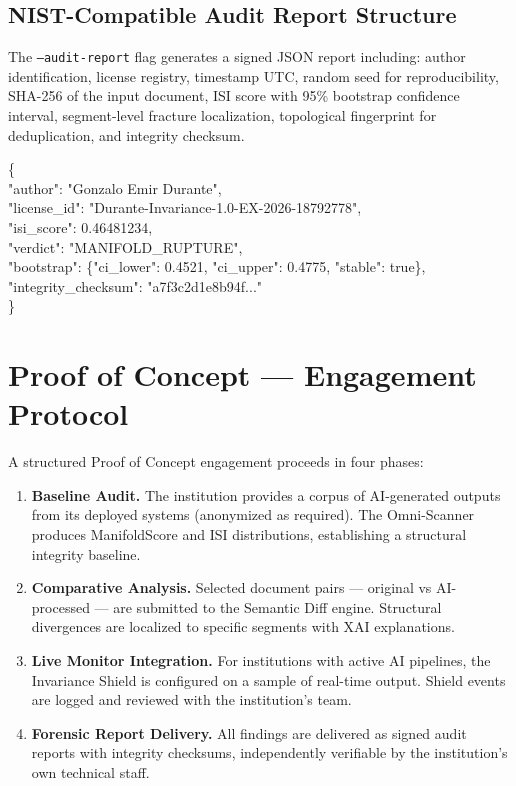 \documentclass[11pt, a4paper]{article}
\begin{document}
\subsection{NIST-Compatible Audit Report Structure}

The \texttt{--audit-report} flag generates a signed JSON report including:
author identification, license registry, timestamp UTC, random seed for
reproducibility, SHA-256 of the input document, ISI score with 95\% bootstrap
confidence interval, segment-level fracture localization, topological fingerprint
for deduplication, and integrity checksum.

\begin{hashbox}
\{\\
\quad "author": "Gonzalo Emir Durante",\\
\quad "license\_id": "Durante-Invariance-1.0-EX-2026-18792778",\\
\quad "isi\_score": 0.46481234,\\
\quad "verdict": "MANIFOLD\_RUPTURE",\\
\quad "bootstrap": \{"ci\_lower": 0.4521, "ci\_upper": 0.4775, "stable": true\},\\
\quad "integrity\_checksum": "a7f3c2d1e8b94f..."\\
\}
\end{hashbox}

\section{Proof of Concept --- Engagement Protocol}

A structured Proof of Concept engagement proceeds in four phases:

\begin{enumerate}[leftmargin=*, label=\textbf{Phase \arabic*.}]
  \item \textbf{Baseline Audit.} The institution provides a corpus of
    AI-generated outputs from its deployed systems (anonymized as required).
    The Omni-Scanner produces ManifoldScore and ISI distributions, establishing
    a structural integrity baseline.
  \item \textbf{Comparative Analysis.} Selected document pairs --- original
    vs AI-processed --- are submitted to the Semantic Diff engine. Structural
    divergences are localized to specific segments with XAI explanations.
  \item \textbf{Live Monitor Integration.} For institutions with active AI
    pipelines, the Invariance Shield is configured on a sample of real-time
    output. Shield events are logged and reviewed with the institution's team.
  \item \textbf{Forensic Report Delivery.} All findings are delivered as
    signed audit reports with integrity checksums, independently verifiable
    by the institution's own technical staff.
\end{enumerate}
\end{document}
